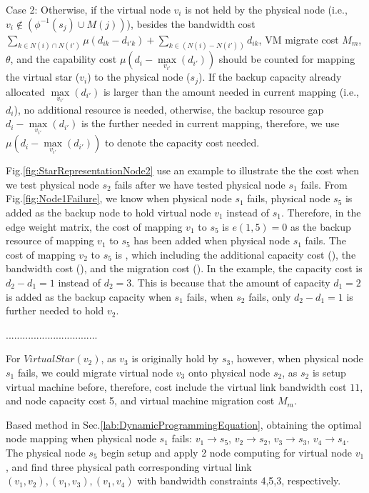 Case 2: Otherwise, if the virtual node $v_i$ is not held by the physical node (i.e., ${{v_i} \notin \left( {{\phi ^{ - 1}}({s_j}) \cup M(j)} \right)}$), besides the bandwidth cost ${\sum\limits_{k \in N(i) \cap N(i')} {\mu({d_{ik}} - {d_{i'k}})}  + \sum\limits_{k \in \left( {N(i) - N(i')} \right)} {{d_{ik}}} }$, VM migrate cost ${ {M_m}}$, $\theta$, and the capability cost ${\mu({d_i} - \mathop {\max }\limits_{{v_{i'}}} \left( {{d_{i'}}} \right))}$ should be counted for mapping the virtual star ($v_i$) to the physical node ($s_j$). If the backup capacity already allocated ${\mathop {\max }\limits_{{v_{i'}}} \left( {{d_{i'}}} \right)}$ is larger than the amount needed  in current mapping (i.e., $d_i$), no additional resource is needed, otherwise, the backup resource gap ${{d_i} - \mathop {\max }\limits_{{v_{i'}}} \left( {{d_{i'}}} \right)}$ is the further needed in current mapping, therefore, we use  ${\mu({d_i} - \mathop {\max }\limits_{{v_{i'}}} \left( {{d_{i'}}} \right))}$ to denote the capacity cost needed.

Fig.\ref{fig:StarRepresentationNode2} use an example to illustrate the the cost when we test physical node $s_2$ fails after we have tested physical node $s_1$ fails. From Fig.\ref{fig:Node1Failure}, we know when physical node $s_1$ fails, physical node $s_5$ is added as the backup node to hold virtual node $v_1$ instead of $s_1$. Therefore, in the  edge weight matrix, the cost of mapping $v_1$ to $s_5$ is  $e(1,5)=0$ as the backup resource of mapping $v_1$ to $s_5$ has been added when physical node $s_1$ fails. The cost of mapping $v_2$ to $s_5$ is , which including the additional capacity cost (), the bandwidth cost (), and the migration cost (). In the example, the capacity cost is $d_2-d_1=1$ instead of $d_2=3$. This is because that the amount of capacity $d_1=2$ is added as the backup capacity when $s_1$ fails, when $s_2$ fails, only $d_2-d_1=1$ is further needed to hold $v_2$.


.................................


For $VirtualStar(v_2)$, as $v_3$ is originally hold by $s_3$, however, when physical node $s_1$ fails, we could migrate virtual node $v_3$ onto physical node $s_2$, as $s_2$ is setup virtual machine before, therefore, cost include the virtual link bandwidth cost $11$, and node capacity cost 5, and virtual machine migration cost $M_m$.

Based method in Sec.\ref{lab:DynamicProgrammingEquation}, obtaining the optimal node mapping when physical node $s_1$ fails: $v_1 \rightarrow s_5$, $v_2 \rightarrow s_2$, $v_3 \rightarrow s_3$, $v_4 \rightarrow s_4$. The physical node $s_5$ begin setup and apply 2 node computing for virtual node $v_1$, and find three physical path corresponding virtual link $(v_1,v_2),(v_1,v_3),(v_1,v_4)$ with bandwidth constraints 4,5,3, respectively.

